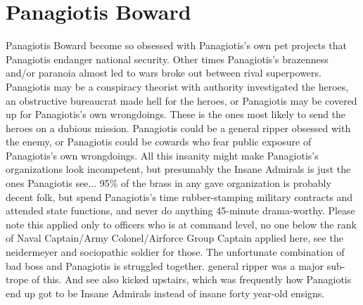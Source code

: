 \documentclass[12pt]{book}
\begin{document}
\chapter{Panagiotis Boward}

Panagiotis Boward become so obsessed with Panagiotis's own pet projects that Panagiotis endanger national security. Other times Panagiotis's brazenness and/or paranoia almost led to wars broke out between rival superpowers. Panagiotis may be a conspiracy theorist with authority investigated the heroes, an obstructive bureaucrat made hell for the heroes, or Panagiotis may be covered up for Panagiotis's own wrongdoings. These is the ones most likely to send the heroes on a dubious mission. Panagiotis could be a general ripper obsessed with the enemy, or Panagiotis could be cowards who fear public exposure of Panagiotis's own wrongdoings. All this insanity might make Panagiotis's organizations look incompetent, but presumably the Insane Admirals is just the ones Panagiotis see... 95\% of the brass in any gave organization is probably decent folk, but spend Panagiotis's time rubber-stamping military contracts and attended state functions, and never do anything 45-minute drama-worthy. Please note this applied only to officers who is at command level, no one below the rank of Naval Captain/Army Colonel/Airforce Group Captain applied here, see the neidermeyer and sociopathic soldier for those. The unfortunate combination of bad boss and Panagiotis is struggled together. general ripper was a major sub-trope of this. And see also kicked upstairs, which was frequently how Panagiotis end up got to be Insane Admirals instead of insane forty year-old ensigns.
\end{document}

